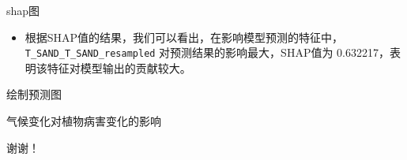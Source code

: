 \documentclass{ldr-simple-gray}
\begin{document}
\begin{frame}{shap图}
    
    \begin{itemize}
        \item 根据SHAP值的结果，我们可以看出，在影响模型预测的特征中，\texttt{\break T\_SAND\_T\_SAND\_resampled} 对预测结果的影响最大，SHAP值为 0.632217，表明该特征对模型输出的贡献较大。  
        
    \end{itemize}
    
\end{frame}

\begin{frame}{绘制预测图}
    

    
\end{frame}



\begin{frame}{气候变化对植物病害变化的影响}
    

    
\end{frame}

\begin{frame}{\quad}
\begin{center}
        谢\quad 谢！
\end{center}

\end{frame}
\end{document}
